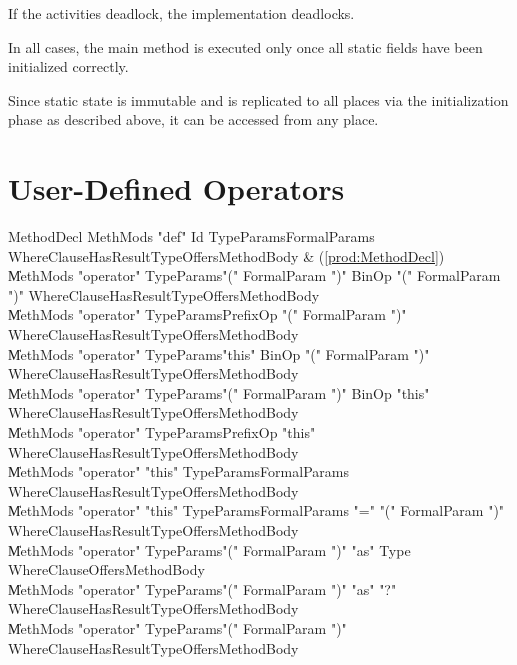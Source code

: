 If the activities deadlock, the implementation deadlocks.

In all cases, the main method is executed only once all static fields
have been initialized correctly.

Since static state is immutable and is replicated to all places via 
the initialization phase as described above, it can be accessed from
any place.



\section{User-Defined Operators}
\label{sect:operators}

\begin{bbgrammar}
          MethodDecl \: MethMods \xcd"def" Id TypeParams\opt FormalParams WhereClause\opt HasResultType\opt Offers\opt MethodBody & (\ref{prod:MethodDecl}) \\
                    \| MethMods \xcd"operator" TypeParams\opt \xcd"(" FormalParam  \xcd")" BinOp \xcd"(" FormalParam  \xcd")" WhereClause\opt HasResultType\opt Offers\opt MethodBody \\
                    \| MethMods \xcd"operator" TypeParams\opt PrefixOp \xcd"(" FormalParam  \xcd")" WhereClause\opt HasResultType\opt Offers\opt MethodBody \\
                    \| MethMods \xcd"operator" TypeParams\opt \xcd"this" BinOp \xcd"(" FormalParam  \xcd")" WhereClause\opt HasResultType\opt Offers\opt MethodBody \\
                    \| MethMods \xcd"operator" TypeParams\opt \xcd"(" FormalParam  \xcd")" BinOp \xcd"this" WhereClause\opt HasResultType\opt Offers\opt MethodBody \\
                    \| MethMods \xcd"operator" TypeParams\opt PrefixOp \xcd"this" WhereClause\opt HasResultType\opt Offers\opt MethodBody \\
                    \| MethMods \xcd"operator" \xcd"this" TypeParams\opt FormalParams WhereClause\opt HasResultType\opt Offers\opt MethodBody \\
                    \| MethMods \xcd"operator" \xcd"this" TypeParams\opt FormalParams \xcd"=" \xcd"(" FormalParam  \xcd")" WhereClause\opt HasResultType\opt Offers\opt MethodBody \\
                    \| MethMods \xcd"operator" TypeParams\opt \xcd"(" FormalParam  \xcd")" \xcd"as" Type WhereClause\opt Offers\opt MethodBody \\
                    \| MethMods \xcd"operator" TypeParams\opt \xcd"(" FormalParam  \xcd")" \xcd"as" \xcd"?" WhereClause\opt HasResultType\opt Offers\opt MethodBody \\
                    \| MethMods \xcd"operator" TypeParams\opt \xcd"(" FormalParam  \xcd")" WhereClause\opt HasResultType\opt Offers\opt MethodBody \\
\end{bbgrammar}


